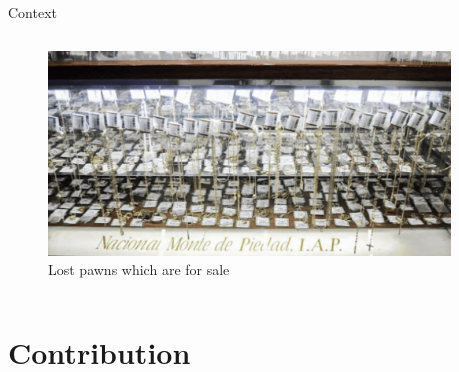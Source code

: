 \documentclass[8pt]{beamer}
\begin{document}
\begin{frame}{Context}
\begin{columns}
\begin{column}{.45\textwidth}
\begin{figure}[H]
\begin{center}
    \end{center}
    \end{figure}
\begin{figure}[H]
    \begin{center}
    \caption{Lost pawns which are for sale}
        \includegraphics[width=0.95\textwidth]{Figuras/empenio3_.png}
    \end{center}
    \end{figure}    
    \end{column}    
    \end{columns}
\end{frame}



\section{Contribution}
\end{document}
